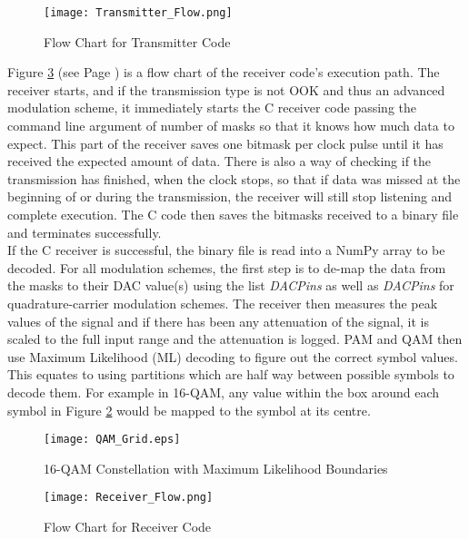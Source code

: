 \documentclass[../main.tex]{subfiles}
\begin{document}
\begin{figure}[ht]
 	\centering
 	\texttt{[image: Transmitter\_Flow.png]}
 	\caption{Flow Chart for Transmitter Code}
 	\label{fig_Transmitter_Flow}
\end{figure}


\clearpage

Figure \ref{fig_Receiver_Flow} (see Page \pageref{fig_Receiver_Flow}) is a flow chart of the receiver code's execution path.
The receiver starts, and if the transmission type is not OOK and thus an advanced modulation scheme, it immediately starts the C receiver code passing the command line argument of number of masks so that it knows how much data to expect.
This part of the receiver saves one bitmask per clock pulse until it has received the expected amount of data.
There is also a way of checking if the transmission has finished, when the clock stops, so that if data was missed at the beginning of or during the transmission, the receiver will still stop listening and complete execution.
The C code then saves the bitmasks received to a binary file and terminates successfully.\\

If the C receiver is successful, the binary file is read into a NumPy array to be decoded.
For all modulation schemes, the first step is to de-map the data from the masks to their DAC value(s) using the list \textit{DAC\textunderscore Pins} as well as \textit{DAC\textunderscore Pins} for quadrature-carrier modulation schemes.
The receiver then measures the peak values of the signal and if there has been any attenuation of the signal, it is scaled to the full input range and the attenuation is logged.
PAM and QAM then use Maximum Likelihood (ML) decoding to figure out the correct symbol values.
This equates to using partitions which are half way between possible symbols to decode them.
For example in 16-QAM, any value within the box around each symbol in Figure \ref{fig_QAM ML Decoding} would be mapped to the symbol at its centre.\\

\begin{figure}[ht]
 	\centering
 	\texttt{[image: QAM\_Grid.eps]}
 	\caption{16-QAM Constellation with Maximum Likelihood Boundaries}
 	\label{fig_QAM ML Decoding}
\end{figure}

\begin{figure}[ht]
 	\centering
 	\texttt{[image: Receiver\_Flow.png]}
 	\caption{Flow Chart for Receiver Code}
 	\label{fig_Receiver_Flow}
\end{figure}
\end{document}
